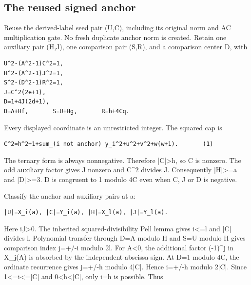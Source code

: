 \subsection{The reused signed anchor}



Reuse the derived-label seed pair (U,C), including its original norm and A\textasteriskcentered{}\allowbreak{}C multiplication gate. No fresh duplicate anchor norm is created. Retain one auxiliary pair (H,J), one comparison pair (S,R), and a comparison center D, with



\begin{verbatim}
U^2-(A^2-1)C^2=1,
H^2-(A^2-1)J^2=1,
S^2-(D^2-1)R^2=1,
J=C^2(2e+1),
D=1+4J(2d+1),
D=A+Hf,       S=U+Hg,       R=h+4Cq.
\end{verbatim}

Every displayed coordinate is an unrestricted integer. The squared cap is



\begin{verbatim}
C^2=h^2+1+sum_(i not anchor) y_i^2+u^2+v^2+w(w+1).       (1)
\end{verbatim}

The ternary form is always nonnegative. Therefore |C|\textgreater{}\allowbreak{}h, so C is nonzero. The odd auxiliary factor gives J nonzero and C\textasciicircum{}\allowbreak{}2 divides J. Consequently |H|\textgreater{}\allowbreak{}=\allowbreak{}a and |D|\textgreater{}\allowbreak{}=\allowbreak{}3. D is congruent to 1 modulo 4C even when C, J or D is negative.



Classify the anchor and auxiliary pairs at a:



\begin{verbatim}
|U|=X_i(a), |C|=Y_i(a), |H|=X_l(a), |J|=Y_l(a).
\end{verbatim}

Here i,l\textgreater{}\allowbreak{}0. The inherited squared-divisibility Pell lemma gives i\textless{}\allowbreak{}=\allowbreak{}l and |C| divides l. Polynomial transfer through D=\allowbreak{}A modulo H and S=\allowbreak{}U modulo H gives comparison index j=\allowbreak{}+\allowbreak{}/\allowbreak{}-i modulo 2l. For A\textless{}\allowbreak{}0, the additional factor (-1)\textasciicircum{}\allowbreak{}j in X\_\allowbreak{}j(A) is absorbed by the independent abscissa sign. At D=\allowbreak{}1 modulo 4C, the ordinate recurrence gives j=\allowbreak{}+\allowbreak{}/\allowbreak{}-h modulo 4|C|. Hence i=\allowbreak{}+\allowbreak{}/\allowbreak{}-h modulo 2|C|. Since 1\textless{}\allowbreak{}=\allowbreak{}i\textless{}\allowbreak{}=\allowbreak{}|C| and 0\textless{}\allowbreak{}h\textless{}\allowbreak{}|C|, only i=\allowbreak{}h is possible. Thus



